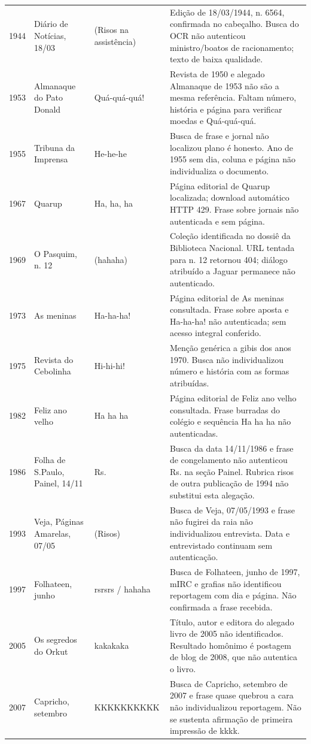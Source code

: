 \begin{longtable}{p{}p{}p{}p{}}
1944 & Diário de Notícias, 18/03 & (Risos na assistência) & Edição de 18/03/1944, n. 6564, confirmada no cabeçalho. Busca do OCR não autenticou ministro/boatos de racionamento; texto de baixa qualidade. \\
1953 & Almanaque do Pato Donald & Quá-quá-quá! & Revista de 1950 e alegado Almanaque de 1953 não são a mesma referência. Faltam número, história e página para verificar moedas e Quá-quá-quá. \\
1955 & Tribuna da Imprensa & He-he-he & Busca de frase e jornal não localizou plano é honesto. Ano de 1955 sem dia, coluna e página não individualiza o documento. \\
1967 & Quarup & Ha, ha, ha & Página editorial de Quarup localizada; download automático HTTP 429. Frase sobre jornais não autenticada e sem página. \\
1969 & O Pasquim, n. 12 & (hahaha) & Coleção identificada no dossiê da Biblioteca Nacional. URL tentada para n. 12 retornou 404; diálogo atribuído a Jaguar permanece não autenticado. \\
1973 & As meninas & Ha-ha-ha! & Página editorial de As meninas consultada. Frase sobre aposta e Ha-ha-ha! não autenticada; sem acesso integral conferido. \\
1975 & Revista do Cebolinha & Hi-hi-hi! & Menção genérica a gibis dos anos 1970. Busca não individualizou número e história com as formas atribuídas. \\
1982 & Feliz ano velho & Ha ha ha & Página editorial de Feliz ano velho consultada. Frase burradas do colégio e sequência Ha ha ha não autenticadas. \\
1986 & Folha de S.Paulo, Painel, 14/11 & Rs. & Busca da data 14/11/1986 e frase de congelamento não autenticou Rs. na seção Painel. Rubrica risos de outra publicação de 1994 não substitui esta alegação. \\
1993 & Veja, Páginas Amarelas, 07/05 & (Risos) & Busca de Veja, 07/05/1993 e frase não fugirei da raia não individualizou entrevista. Data e entrevistado continuam sem autenticação. \\
1997 & Folhateen, junho & rsrsrs / hahaha & Busca de Folhateen, junho de 1997, mIRC e grafias não identificou reportagem com dia e página. Não confirmada a frase recebida. \\
2005 & Os segredos do Orkut & kakakaka & Título, autor e editora do alegado livro de 2005 não identificados. Resultado homônimo é postagem de blog de 2008, que não autentica o livro. \\
2007 & Capricho, setembro & KKKKK\allowbreak KKKKK & Busca de Capricho, setembro de 2007 e frase quase quebrou a cara não individualizou reportagem. Não se sustenta afirmação de primeira impressão de kkkk. \\
\bottomrule\end{longtable}\normalsize